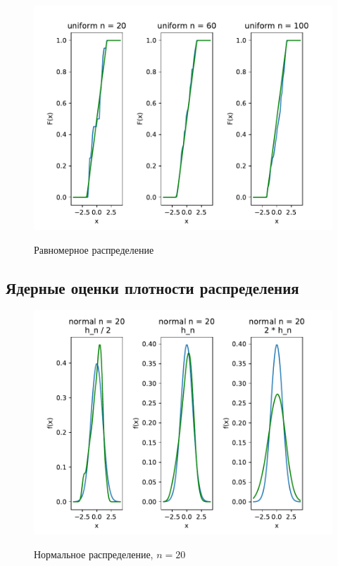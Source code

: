 \documentclass[a4paper]{article}
\begin{document}
\begin{figure}[H]
	\centering
	{\includegraphics[scale=0.5]{src_lab_4/emperical_fun_uniform}}
		\caption{Равномерное распределение}
		\label{fig:uniform}
	\end{figure}

\subsection{Ядерные оценки плотности распределения}
\begin{figure}[H]
	\centering
	{\includegraphics[scale=0.5]{src_lab_4/kde_20_normal}}
		\caption{Нормальное распределение, $n=20$}
		\label{fig:kde_normal_20}
	\end{figure}
\end{document}
